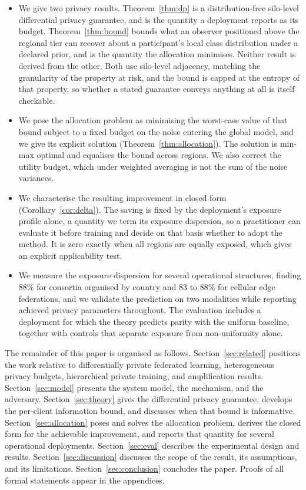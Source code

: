 \documentclass[acmsmall,screen,review,anonymous]{acmart}
\theoremstyle{acmdefinition}%
\begin{document}
\begin{itemize}
\item We give two privacy results. Theorem~\ref{thm:dp} is a distribution-free
silo-level differential privacy guarantee, and is the quantity a deployment reports
as its budget. Theorem~\ref{thm:bound} bounds what an observer positioned above the
regional tier can recover about a participant's local class distribution under a
declared prior, and is the quantity the allocation minimises. Neither result is
derived from the other. Both use silo-level adjacency, matching the granularity of
the property at risk, and the bound is capped at the entropy of that property, so
whether a stated guarantee conveys anything at all is itself checkable.

\item We pose the allocation problem as minimising the worst-case value of that
bound subject to a fixed budget on the noise entering the global model, and we give
its explicit solution (Theorem~\ref{thm:allocation}). The solution is min-max
optimal and equalises the bound across regions. We also correct the utility budget,
which under weighted averaging is not the sum of the noise variances.

\item We characterise the resulting improvement in closed form
(Corollary~\ref{cor:delta}). The saving is fixed by the deployment's exposure
profile alone, a quantity we term its exposure dispersion, so a practitioner can
evaluate it before training and decide on that basis whether to adopt the method.
It is zero exactly when all regions are equally exposed, which gives an explicit
applicability test.

\item We measure the exposure dispersion for several operational structures,
finding $88\%$ for consortia organised by country and $83$ to $88\%$ for cellular
edge federations, and we validate the prediction on two modalities while reporting
achieved privacy parameters throughout. The evaluation includes a deployment for
which the theory predicts parity with the uniform baseline, together with controls
that separate exposure from non-uniformity alone.
\end{itemize}

The remainder of this paper is organised as follows. Section~\ref{sec:related}
positions the work relative to differentially private federated learning,
heterogeneous privacy budgets, hierarchical private training, and amplification
results. Section~\ref{sec:model} presents the system model, the mechanism, and the
adversary. Section~\ref{sec:theory} gives the differential privacy guarantee,
develops the per-client information bound, and discusses when that bound is
informative. Section~\ref{sec:allocation} poses and solves the allocation problem,
derives the closed form for the achievable improvement, and reports that quantity
for several operational deployments. Section~\ref{sec:eval} describes the
experimental design and results. Section~\ref{sec:discussion} discusses the scope
of the result, its assumptions, and its limitations. Section~\ref{sec:conclusion}
concludes the paper. Proofs of all formal statements appear in the appendices.
\end{document}
